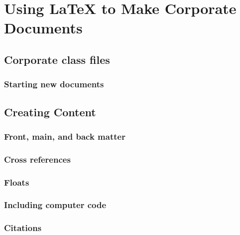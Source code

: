 \section{Using LaTeX to Make Corporate Documents }


\subsection{Corporate class files}\label{sec:Corporatecls}


\subsubsection{Starting new documents}\label{sec:NewDocs}


\subsection{Creating Content}
\subsubsection{Front, main, and back matter}


\subsubsection{Cross references}


\subsubsection{Floats}


\subsubsection{Including computer code}\label{Sec:Codes}


\subsubsection{Citations}\label{Sec:Citations}


